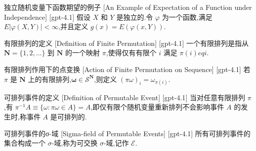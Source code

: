 \documentclass[UTF8]{ctexart}
\begin{document}
    
    
    \begin{xmp}
        {独立随机变量下函数期望的例子}
        [An Example of Expectation of a Function under Independence]
        [gpt-4.1]
        假设 $X$ 和 $Y$ 是独立的.令 $\varphi$ 为一个函数,满足 $E|\varphi(X, Y)| < \infty$,并且定义 $g(x) = E(\varphi(x, Y))$.
    \end{xmp}
    
    
    
    \begin{dfn}
        {有限排列的定义}
        [Definition of Finite Permutation]
        [gpt-4.1]
        一个有限排列是指从 $\mathbf{N} = \{ 1, 2, \ldots \}$ 到 $\mathbf{N}$ 的一个映射 $\pi$,使得仅有有限个 $i$ 满足 $\pi(i) 
eq i$.
    \end{dfn}
    
    
    
    \begin{dfn}
        {有限排列作用下的点变换}
        [Action of Finite Permutation on Sequence]
        [gpt-4.1]
        若 $\pi$ 是 $\mathbf{N}$ 上的有限排列,$\boldsymbol{\omega} \in \mathcal{S}^{\mathbf{N}}$,则定义 $(\pi \omega)_i = \omega_{\pi(i)}$.
    \end{dfn}
    
    
    
    \begin{dfn}
        {可排列事件的定义}
        [Definition of Permutable Event]
        [gpt-4.1]
        当对任意有限排列 $\pi$,有 $\pi^{-1} A \equiv \{ \omega : \pi \omega \in A \} = A$,即仅有限个随机变量重新排列不会影响事件 $A$ 的发生时,称事件 $A$ 是可排列的.
    \end{dfn}
    
    
    
    \begin{dfn}
        {可排列事件的σ-域}
        [Sigma-field of Permutable Events]
        [gpt-4.1]
        所有可排列事件的集合构成一个 $\sigma$-域,称为可交换 $\sigma$-域,记作 $\mathcal{E}$.
    \end{dfn}
    
    
    
\end{document}
